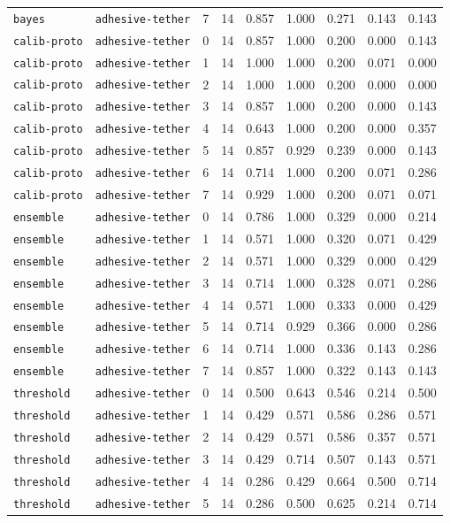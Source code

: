 \documentclass{article}
\begin{document}
\begin{center}
{\begin{tabular}{llllccccc}
\texttt{bayes} & \texttt{adhesive-tether} & 7 & 14 & 0.857 & 1.000 & 0.271 & 0.143 & 0.143 \\
\texttt{calib-proto} & \texttt{adhesive-tether} & 0 & 14 & 0.857 & 1.000 & 0.200 & 0.000 & 0.143 \\
\texttt{calib-proto} & \texttt{adhesive-tether} & 1 & 14 & 1.000 & 1.000 & 0.200 & 0.071 & 0.000 \\
\texttt{calib-proto} & \texttt{adhesive-tether} & 2 & 14 & 1.000 & 1.000 & 0.200 & 0.000 & 0.000 \\
\texttt{calib-proto} & \texttt{adhesive-tether} & 3 & 14 & 0.857 & 1.000 & 0.200 & 0.000 & 0.143 \\
\texttt{calib-proto} & \texttt{adhesive-tether} & 4 & 14 & 0.643 & 1.000 & 0.200 & 0.000 & 0.357 \\
\texttt{calib-proto} & \texttt{adhesive-tether} & 5 & 14 & 0.857 & 0.929 & 0.239 & 0.000 & 0.143 \\
\texttt{calib-proto} & \texttt{adhesive-tether} & 6 & 14 & 0.714 & 1.000 & 0.200 & 0.071 & 0.286 \\
\texttt{calib-proto} & \texttt{adhesive-tether} & 7 & 14 & 0.929 & 1.000 & 0.200 & 0.071 & 0.071 \\
\texttt{ensemble} & \texttt{adhesive-tether} & 0 & 14 & 0.786 & 1.000 & 0.329 & 0.000 & 0.214 \\
\texttt{ensemble} & \texttt{adhesive-tether} & 1 & 14 & 0.571 & 1.000 & 0.320 & 0.071 & 0.429 \\
\texttt{ensemble} & \texttt{adhesive-tether} & 2 & 14 & 0.571 & 1.000 & 0.329 & 0.000 & 0.429 \\
\texttt{ensemble} & \texttt{adhesive-tether} & 3 & 14 & 0.714 & 1.000 & 0.328 & 0.071 & 0.286 \\
\texttt{ensemble} & \texttt{adhesive-tether} & 4 & 14 & 0.571 & 1.000 & 0.333 & 0.000 & 0.429 \\
\texttt{ensemble} & \texttt{adhesive-tether} & 5 & 14 & 0.714 & 0.929 & 0.366 & 0.000 & 0.286 \\
\texttt{ensemble} & \texttt{adhesive-tether} & 6 & 14 & 0.714 & 1.000 & 0.336 & 0.143 & 0.286 \\
\texttt{ensemble} & \texttt{adhesive-tether} & 7 & 14 & 0.857 & 1.000 & 0.322 & 0.143 & 0.143 \\
\texttt{threshold} & \texttt{adhesive-tether} & 0 & 14 & 0.500 & 0.643 & 0.546 & 0.214 & 0.500 \\
\texttt{threshold} & \texttt{adhesive-tether} & 1 & 14 & 0.429 & 0.571 & 0.586 & 0.286 & 0.571 \\
\texttt{threshold} & \texttt{adhesive-tether} & 2 & 14 & 0.429 & 0.571 & 0.586 & 0.357 & 0.571 \\
\texttt{threshold} & \texttt{adhesive-tether} & 3 & 14 & 0.429 & 0.714 & 0.507 & 0.143 & 0.571 \\
\texttt{threshold} & \texttt{adhesive-tether} & 4 & 14 & 0.286 & 0.429 & 0.664 & 0.500 & 0.714 \\
\texttt{threshold} & \texttt{adhesive-tether} & 5 & 14 & 0.286 & 0.500 & 0.625 & 0.214 & 0.714 \\
\bottomrule
\end{tabular}%
}
\end{center}
\end{document}
